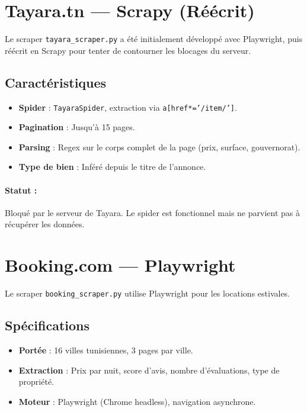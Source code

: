\documentclass[12pt,a4paper]{report}
\begin{document}
\section{Tayara.tn — Scrapy (Réécrit)}

Le scraper \texttt{tayara\_scraper.py} a été initialement développé avec Playwright, puis réécrit en Scrapy pour tenter de contourner les blocages du serveur.

\subsection{Caractéristiques}
\begin{itemize}
    \item \textbf{Spider} : \texttt{TayaraSpider}, extraction via \texttt{a[href*='/item/']}.
    \item \textbf{Pagination} : Jusqu'à 15 pages.
    \item \textbf{Parsing} : Regex sur le corps complet de la page (prix, surface, gouvernorat).
    \item \textbf{Type de bien} : Inféré depuis le titre de l'annonce.
\end{itemize}

\paragraph{Statut :} Bloqué par le serveur de Tayara. Le spider est fonctionnel mais ne parvient pas à récupérer les données.

\section{Booking.com — Playwright}

Le scraper \texttt{booking\_scraper.py} utilise Playwright pour les locations estivales.

\subsection{Spécifications}
\begin{itemize}
    \item \textbf{Portée} : 16 villes tunisiennes, 3 pages par ville.
    \item \textbf{Extraction} : Prix par nuit, score d'avis, nombre d'évaluations, type de propriété.
    \item \textbf{Moteur} : Playwright (Chrome headless), navigation asynchrone.
\end{itemize}
\end{document}
